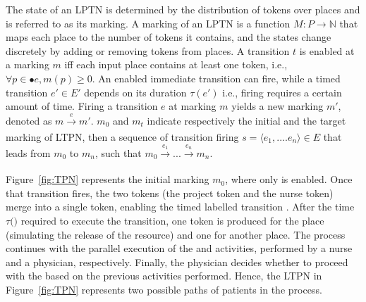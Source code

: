 The state of an LPTN is determined by the distribution of tokens over places and is referred to as its marking. A marking of an LPTN is a function $M : P \rightarrow \mathbb{N}$ that maps each place to the number of tokens it contains, and the states change discretely by adding or removing tokens from places. A transition $t$ is enabled at a marking $m$ iff each input place contains at least one token, i.e., $\forall p \in \bullet e, m(p) \ge 0$. An enabled immediate transition can fire, while a timed transition $e' \in E'$ depends on its duration $\tau(e')$ i.e., firing requires a certain amount of time.
Firing a transition $e$ at marking $m$ yields a new marking $m'$, denoted as $m \xrightarrow[]{e} m'$.
$m_0$ and $m_t$ indicate respectively the initial and the target marking of LTPN, then a sequence of transition firing $s = \langle e_1, .... e_n \rangle \in E$ that leads from $m_0$ to $m_n$, such that $m_0 \xrightarrow[]{e_1} ... \xrightarrow[]{e_n} m_n$. 

Figure~\ref{fig:TPN} represents the initial marking $m_0$, where only  is enabled. Once that transition fires, the two tokens (the project token and the nurse token) merge into a single token, enabling the timed labelled transition . After the time $\tau($$)$ required to execute the transition, one token is produced for the  place (simulating the release of the resource) and one for another place.
The process continues with the parallel execution of the  and  activities, performed by a nurse and a physician, respectively. Finally, the physician decides whether to proceed with the  based on the previous activities performed. Hence, the LTPN in Figure~\ref{fig:TPN} represents two possible paths of patients in the process. 


